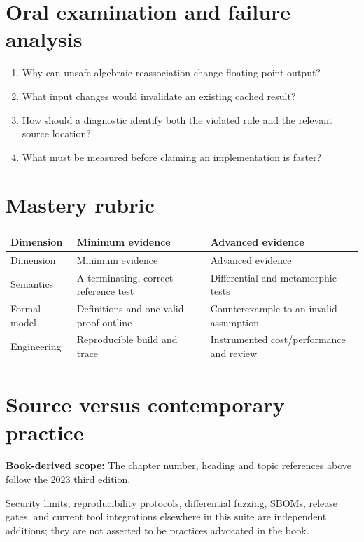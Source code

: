\documentclass[10pt,letterpaper]{article}
\begin{document}
\section{Oral examination and failure analysis}
\begin{enumerate}
\item Why can unsafe algebraic reassociation change floating-point output?
\item What input changes would invalidate an existing cached result?
\item How should a diagnostic identify both the violated rule and the relevant source location?
\item What must be measured before claiming an implementation is faster?
\end{enumerate}

\section{Mastery rubric}
\begin{longtable}{|>{\raggedright\arraybackslash}p{}|>{\raggedright\arraybackslash}p{}|>{\raggedright\arraybackslash}p{}|}
\hline
Dimension & Minimum evidence & Advanced evidence\\ \hline\endfirsthead
\hline
Dimension & Minimum evidence & Advanced evidence\\ \hline\endhead
Semantics & A terminating, correct reference test & Differential and metamorphic tests\\ \hline
Formal model & Definitions and one valid proof outline & Counterexample to an invalid assumption\\ \hline
Engineering & Reproducible build and trace & Instrumented cost/performance and review\\ \hline
\end{longtable}

\section{Source versus contemporary practice}
\textbf{Book-derived scope:} The chapter number, heading and topic references above follow the 2023 third edition.\par\modern Security limits, reproducibility protocols, differential fuzzing, SBOMs, release gates, and current tool integrations elsewhere in this suite are independent additions; they are not asserted to be practices advocated in the book.
\end{document}
